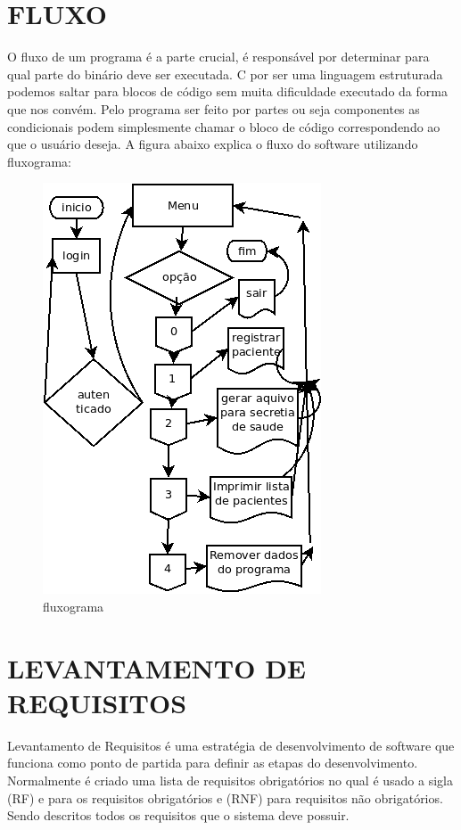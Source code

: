 \documentclass[
	12pt,				%
	oneside,			%
	a4paper,			%
  section=TITLE,
	brazil,				%
	]{abntex2}
\begin{document}
\section{FLUXO}

O fluxo de um programa é a parte crucial, é responsável por determinar para
qual parte do binário deve ser executada. C por ser uma linguagem estruturada
podemos saltar para blocos de código sem muita dificuldade executado da forma
que nos convém. Pelo programa ser feito por partes ou seja componentes as
condicionais podem simplesmente chamar o bloco de código correspondendo ao que
o usuário deseja. A figura abaixo explica o fluxo do software utilizando
fluxograma:

\begin{figure}[htb]
\caption{\label{fig_fluxo}fluxograma}
\begin{center}
\includegraphics[scale=1.10]{img/fluxo.png}
\end{center}
\end{figure}

\section{LEVANTAMENTO DE REQUISITOS}

Levantamento de Requisitos é uma estratégia de desenvolvimento de software que
funciona como ponto de partida para definir as etapas do desenvolvimento.
Normalmente é criado uma lista de requisitos obrigatórios no qual é usado a
sigla (RF) e para os requisitos obrigatórios e (RNF) para requisitos não
obrigatórios. Sendo descritos todos os requisitos que o sistema deve possuir.
\end{document}
